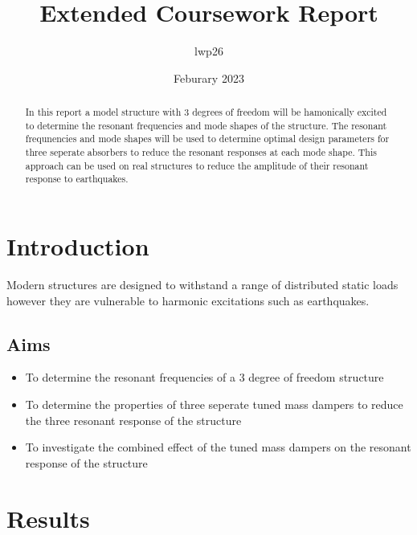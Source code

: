 \documentclass[8pt]{article}
\begin{document}

\title{Extended Coursework Report}
\author{lwp26}
\date{Feburary 2023}
\maketitle

\begin{abstract}
    \centering
    In this report a model structure with 3 degrees of freedom will be hamonically excited to determine the resonant frequencies and mode shapes of the structure.
    The resonant frequnencies and mode shapes will be used to determine optimal design parameters for three seperate absorbers to reduce the resonant responses at each mode shape.
    This approach can be used on real structures to reduce the amplitude of their resonant response to earthquakes.
\end{abstract}

\section{Introduction}


Modern structures are designed to withstand a range of distributed static loads however they are vulnerable to harmonic excitations such as earthquakes.


\subsection{Aims}

\begin{itemize}
\item To determine the resonant frequencies of a 3 degree of freedom structure
\item To determine the properties of three seperate tuned mass dampers to reduce the three resonant response of the structure
\item To investigate the combined effect of the tuned mass dampers on the resonant response of the structure
\end{itemize}

\newpage

\section{Results}
\end{document}
